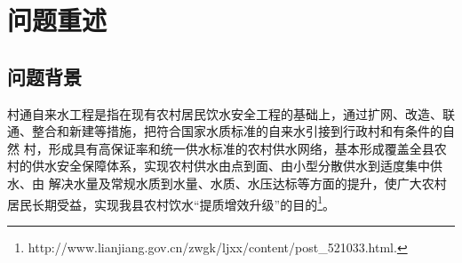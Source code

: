 \documentclass{whutmod}
\begin{document}
\begin{abstract}
		针对问题三，在分析功率约束条件的前提下提出了孤立点的概念，深入探讨了孤立点对农村供水的影响，在问题一的基础上分析得出，要实现全面供水，必须消除所有无法与其他供水站相连的孤立点。本组对II级供水站进行编码，设计免疫遗传算法，通过优化需要升级的II级供水站个数最小，实现全面供水。求得最少需要升级一个二级供水站？？？，这种配置下铺设管道的总里程最少是？？？。最后对求解结果进行灵敏度分析。
		\\
	
		本文的优点为：
		1.问题一与问题二算法原理基于经典图论算法Prim算法，所得解可被证明为全局最优解。2. 基于免疫遗传算法进行优化计算，使得算法具有很强的鲁棒性，且兼顾了局部搜素能力和全局搜索能力。
		
	\end{abstract}


	\thispagestyle{empty}
	\tableofcontents
	\setcounter{page}{0}                                               
	\newpage	%
	

	
	\section{问题重述}	
		\subsection{问题背景}
	村通自来水工程是指在现有农村居民饮水安全工程的基础上，通过扩网、改造、联通、整合和新建等措施，把符合国家水质标准的自来水引接到行政村和有条件的自然 村，形成具有高保证率和统一供水标准的农村供水网络，基本形成覆盖全县农村的供水安全保障体系，实现农村供水由点到面、由小型分散供水到适度集中供水、由 解决水量及常规水质到水量、水质、水压达标等方面的提升，使广大农村居民长期受益，实现我县农村饮水“提质增效升级”的目的\footnote{\quad http://www.lianjiang.gov.cn/zwgk/ljxx/content/post\_521033.html.}。
	
\end{document}
